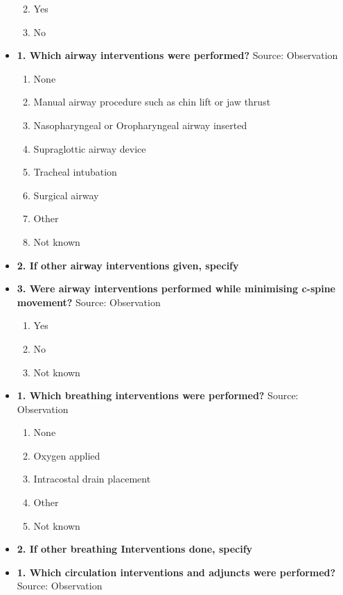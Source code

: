 \documentclass[
]{scrartcl}
\providecommand{\tightlist}{%
  \setlength{\itemsep}{0pt}\setlength{\parskip}{0pt}}\usepackage{longtable,booktabs,array}
\begin{document}
\begin{itemize}
  \begin{enumerate}
  \def\labelenumi{\arabic{enumi}.}
  \tightlist
  \item
    Yes
  \item
    No
  \end{enumerate}
\item
  \textbf{1. Which airway interventions were performed?} Source:
  Observation

  \begin{enumerate}
  \def\labelenumi{\arabic{enumi}.}
  \tightlist
  \item
    None
  \item
    Manual airway procedure such as chin lift or jaw thrust
  \item
    Nasopharyngeal or Oropharyngeal airway inserted
  \item
    Supraglottic airway device
  \item
    Tracheal intubation
  \item
    Surgical airway
  \item
    Other
  \item
    Not known
  \end{enumerate}
\item
  \textbf{2. If other airway interventions given, specify}
\item
  \textbf{3. Were airway interventions performed while minimising
  c-spine movement?} Source: Observation

  \begin{enumerate}
  \def\labelenumi{\arabic{enumi}.}
  \tightlist
  \item
    Yes
  \item
    No
  \item
    Not known
  \end{enumerate}
\item
  \textbf{1. Which breathing interventions were performed?} Source:
  Observation

  \begin{enumerate}
  \def\labelenumi{\arabic{enumi}.}
  \tightlist
  \item
    None
  \item
    Oxygen applied
  \item
    Intracostal drain placement
  \item
    Other
  \item
    Not known
  \end{enumerate}
\item
  \textbf{2. If other breathing Interventions done, specify}
\item
  \textbf{1. Which circulation interventions and adjuncts were
  performed?} Source: Observation


\end{itemize}
\end{document}
